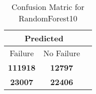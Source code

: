 \begin{table}[] 
\caption{Confusion Matric for RandomForest10} 
\label{Table: Prediction Accuracy-DMDRandomForest10OnlySunEKF-resetReflection-Reflection} 
\centering 
\begin{tabular} 
 {@{}ccc@{}} 
\toprule 
\multicolumn{2}{c}{\textbf{Predicted}}
 \\ \midrule 
\multicolumn{1}{|c|}{Failure} & 
\multicolumn{1}{c|}{No Failure}
 \\ \midrule 
\multicolumn{1}{|c|}{\color{green}\textbf{111918}} & 
\multicolumn{1}{c|}{\color{red}\textbf{12797}}
 \\ \midrule 
\multicolumn{1}{|c|}{\color{red}\textbf{23007}} & 
\multicolumn{1}{c|}{\color{green}\textbf{22406}}
 \\ \bottomrule 
\end{tabular} 
\end{table} 
